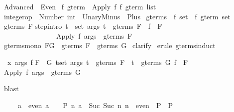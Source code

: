 %
\begin{isabellebody}%
\def\isabellecontext{Advanced}%
\isanewline
{}\ Advanced\ {\isacharequal}\ Even{\isacharcolon}\isanewline
\isanewline
\isanewline
{}\ {\isacharprime}f\ gterm\ {\isacharequal}\ Apply\ {\isacharprime}f\ {\isachardoublequote}{\isacharprime}f\ gterm\ list{\isachardoublequote}\isanewline
\isanewline
{}\ integer{\isacharunderscore}op\ {\isacharequal}\ Number\ int\ {\isacharbar}\ UnaryMinus\ {\isacharbar}\ Plus\isanewline
\isanewline
{}\ gterms\ {\isacharcolon}{\isacharcolon}\ {\isachardoublequote}{\isacharprime}f\ set\ {\isasymRightarrow}\ {\isacharprime}f\ gterm\ set{\isachardoublequote}\isanewline
{}\ {\isachardoublequote}gterms\ F{\isachardoublequote}\isanewline
{}\isanewline
step{\isacharbrackleft}intro{\isacharbang}{\isacharbrackright}{\isacharcolon}\ {\isachardoublequote}{\isasymlbrakk}{\isasymforall}t\ {\isasymin}\ set\ args{\isachardot}\ t\ {\isasymin}\ gterms\ F{\isacharsemicolon}\ \ f\ {\isasymin}\ F{\isasymrbrakk}\isanewline
\ \ \ \ \ \ \ \ \ \ \ \ \ \ \ {\isasymLongrightarrow}\ {\isacharparenleft}Apply\ f\ args{\isacharparenright}\ {\isasymin}\ gterms\ F{\isachardoublequote}\isanewline
\isanewline
{}\ gterms{\isacharunderscore}mono{\isacharcolon}\ {\isachardoublequote}F{\isasymsubseteq}G\ {\isasymLongrightarrow}\ gterms\ F\ {\isasymsubseteq}\ gterms\ G{\isachardoublequote}\isanewline
{}\ clarify\isanewline
{}\ {\isacharparenleft}erule\ gterms{\isachardot}induct{\isacharparenright}%
\begin{isamarkuptxt}%
\begin{isabelle}%
\ {}{\isachardot}\ {\isasymAnd}x\ args\ f{\isachardot}\isanewline
{}F\ {\isasymsubseteq}\ G{\isacharsemicolon}\ {\isasymforall}t{\isasymin}set\ args{\isachardot}\ t\ {\isasymin}\ gterms\ F\ {\isasymand}\ t\ {\isasymin}\ gterms\ G{\isacharsemicolon}\ f\ {\isasymin}\ F{\isasymrbrakk}\isanewline
{}\ Apply\ f\ args\ {\isasymin}\ gterms\ G%
\end{isabelle}%
\end{isamarkuptxt}%
\ blast\isanewline
{}%
\begin{isamarkuptext}%
\begin{isabelle}%
\ \ \ \ \ {\isasymlbrakk}a\ {\isasymin}\ even{\isacharsemicolon}\ a\ {\isacharequal}\ {}\ {\isasymLongrightarrow}\ P{\isacharsemicolon}\ {\isasymAnd}n{\isachardot}\ {\isasymlbrakk}a\ {\isacharequal}\ Suc\ {\isacharparenleft}Suc\ n{\isacharparenright}{\isacharsemicolon}\ n\ {\isasymin}\ even{\isasymrbrakk}\ {\isasymLongrightarrow}\ P{\isasymrbrakk}\ {\isasymLongrightarrow}\ P%
\end{isabelle}


\end{isamarkuptext}
\end{isabellebody}
